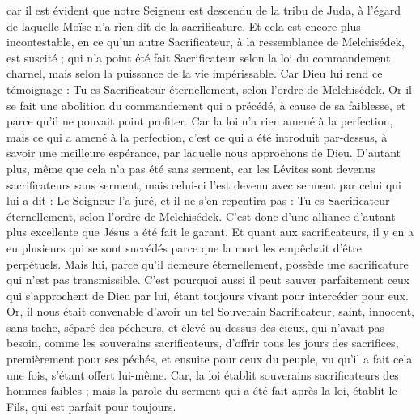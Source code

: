 \begin{multicols}{2}
car il est évident que notre Seigneur est descendu de la tribu de Juda, à l'égard de laquelle Moïse n'a rien dit de la sacrificature.
Et cela est encore plus incontestable, en ce qu'un autre Sacrificateur, à la ressemblance de Melchisédek, est suscité ;
qui n'a point été fait Sacrificateur selon la loi du commandement charnel, mais selon la puissance de la vie impérissable.
Car Dieu  lui rend ce témoignage : Tu es Sacrificateur éternellement, selon l'ordre de Melchisédek.
Or il se fait une abolition du commandement qui a précédé, à cause de sa faiblesse, et parce qu'il ne pouvait point profiter.
Car la loi n'a rien amené à la perfection, mais ce qui a amené à la perfection, c'est ce qui a été introduit par-dessus, à savoir une meilleure espérance, par laquelle nous approchons de Dieu.
D'autant plus, même que cela n'a pas été sans serment,
car les Lévites sont devenus sacrificateurs sans serment, mais celui-ci l'est devenu avec serment par celui qui lui a dit : Le Seigneur l'a juré, et il ne s'en repentira pas : Tu es Sacrificateur éternellement, selon l'ordre de Melchisédek.
C'est donc d'une alliance d'autant plus excellente que Jésus a été fait le garant.
Et quant aux sacrificateurs, il y en a eu plusieurs qui se sont succédés parce que la mort les empêchait d'être perpétuels.
Mais lui, parce qu'il demeure éternellement, possède une sacrificature qui n'est pas transmissible.
C'est pourquoi aussi il peut sauver parfaitement ceux qui s'approchent de Dieu par lui, étant toujours vivant pour intercéder pour eux.
Or, il nous était convenable d'avoir un tel Souverain Sacrificateur, saint, innocent, sans tache, séparé des pécheurs, et élevé au-dessus des cieux,
qui n'avait pas besoin, comme les souverains sacrificateurs, d'offrir tous les jours des sacrifices, premièrement pour ses péchés, et ensuite pour ceux du peuple, vu qu'il a fait cela une fois, s'étant offert lui-même.
Car, la loi établit souverains sacrificateurs des hommes faibles ; mais la parole du serment qui a été fait après la loi, établit le Fils, qui est parfait pour toujours.

\end{multicols}
